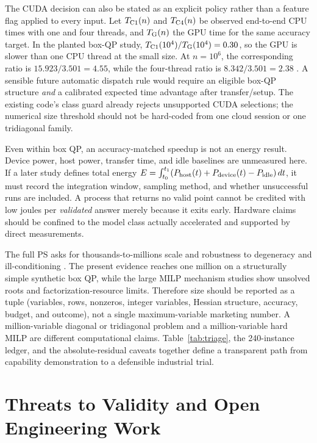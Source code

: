\documentclass[10pt,a4paper,twocolumn]{article}
\begin{document}
The CUDA decision can also be stated as an explicit policy rather than a feature flag applied to every input. Let $T_{\rm C1}(n)$ and $T_{\rm C4}(n)$ be observed end-to-end CPU times with one and four threads, and $T_{\rm G}(n)$ the GPU time for the same accuracy target. In the planted box-QP study, $T_{\rm C1}(10^4)/T_{\rm G}(10^4)=0.30$, so the GPU is slower than one CPU thread at the small size. At $n=10^6$, the corresponding ratio is $15.923/3.501=4.55$, while the four-thread ratio is $8.342/3.501=2.38$ \cite{gpu03}. A sensible future automatic dispatch rule would require an eligible box-QP structure \emph{and} a calibrated expected time advantage after transfer/setup. The existing code's class guard already rejects unsupported CUDA selections; the numerical size threshold should not be hard-coded from one cloud session or one tridiagonal family.

Even within box QP, an accuracy-matched speedup is not an energy result. Device power, host power, transfer time, and idle baselines are unmeasured here. If a later study defines total energy $E=\int_{t_0}^{t_1}(P_{\rm host}(t)+P_{\rm device}(t)-P_{\rm idle})\,dt$, it must record the integration window, sampling method, and whether unsuccessful runs are included. A process that returns no valid point cannot be credited with low joules per \emph{validated} answer merely because it exits early. Hardware claims should be confined to the model class actually accelerated and supported by direct measurements.

The full PS asks for thousands-to-millions scale and robustness to degeneracy and ill-conditioning \cite{ps}. The present evidence reaches one million on a structurally simple synthetic box QP, while the large MILP mechanism studies show unsolved roots and factorization-resource limits. Therefore size should be reported as a tuple (variables, rows, nonzeros, integer variables, Hessian structure, accuracy, budget, and outcome), not a single maximum-variable marketing number. A million-variable diagonal or tridiagonal problem and a million-variable hard MILP are different computational claims. Table~\ref{tab:triage}, the 240-instance ledger, and the absolute-residual caveats together define a transparent path from capability demonstration to a defensible industrial trial.

\section{Threats to Validity and Open Engineering Work}
\end{document}
